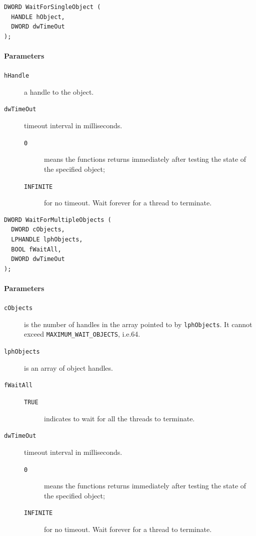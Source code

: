 \begin{verbatim}
DWORD WaitForSingleObject (
  HANDLE hObject,
  DWORD dwTimeOut
);
\end{verbatim}

\paragraph{Parameters}
\begin{description}
\item [\texttt{hHandle}] a handle to the object.
\item [\texttt{dwTimeOut}] timeout interval in milliseconds.
\begin{description}
\item [\texttt{0}] means the functions returns immediately after testing the state of the specified object;
\item [\texttt{INFINITE}] for no timeout. Wait forever for a thread to terminate.
\end{description}
\end{description}

\begin{verbatim}
DWORD WaitForMultipleObjects (
  DWORD cObjects,
  LPHANDLE lphObjects,
  BOOL fWaitAll,
  DWORD dwTimeOut
);
\end{verbatim}

\paragraph{Parameters}
\begin{description}
\item [\texttt{cObjects}] is the number of handles in the array pointed to by \texttt{lphObjects}. It cannot exceed \texttt{MAXIMUM\_WAIT\_OBJECTS}, i.e.\@ 64.
\item [\texttt{lphObjects}] is an array of object handles.
\item [\texttt{fWaitAll}]
\begin{description}
\item [\texttt{TRUE}] indicates to wait for all the threads to terminate.
\end{description}
\item [\texttt{dwTimeOut}] timeout interval in milliseconds.
\begin{description}
\item [\texttt{0}] means the functions returns immediately after testing the state of the specified object;
\item [\texttt{INFINITE}] for no timeout. Wait forever for a thread to terminate.
\end{description}
\end{description}

